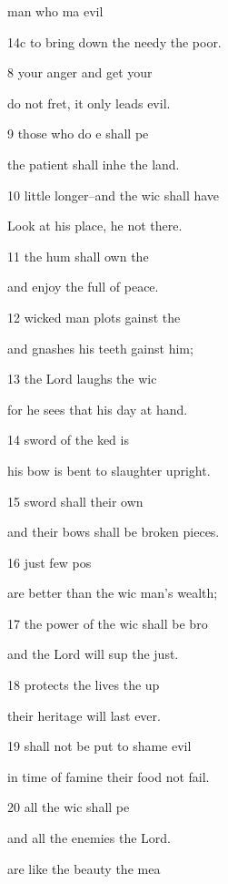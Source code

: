  man who ma evil  

14c to bring down the needy  the poor. 

8  your anger and get your  

do not fret, it only leads  evil. 

9  those who do e shall pe 

the patient shall inhe the land. 

10  little longer--and the wic shall have  

Look at his place, he  not there. 

11  the hum shall own the  

and enjoy the full of peace. 

12  wicked man plots gainst the  

and gnashes his teeth gainst him; 

13  the Lord laughs  the wic 

for he sees that his day  at hand. 

14  sword of the ked is  

his bow is bent to slaughter  upright. 

15  sword shall  their own  

and their bows shall be broken  pieces. 

16  just  few pos 

are better than the wic man's wealth; 

17  the power of the wic shall be bro 

and the Lord will sup the just. 

18  protects the lives  the up 

their heritage will last  ever. 

19  shall not be put to shame  evil  

in time of famine their food  not fail. 

20  all the wic shall pe 

and all the enemies  the Lord. 

 are like the beauty  the mea 

